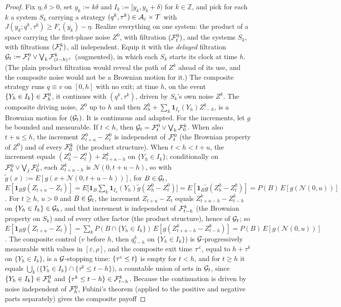 \begin{proof}
Fix $\eta,\delta>0$, set $y_k:=k\delta$ and $I_k:=[y_k,y_k+\delta)$ for $k\in\mathbb Z$, and pick for each $k$ a system $S_k$ carrying a strategy $(q^k,\tau^k)\in\mathcal{A}_\varepsilon\times\mathcal{T}$ with $J(y_k;q^k,\tau^k)\ge F_\varepsilon(y_k)-\eta$. Realize everything on one system: the product of a space carrying the first-phase noise $Z^0$, with filtration $(\mathcal{F}^0_t)$, and the systems $S_k$, with filtrations $(\mathcal{F}^k_t)$, all independent. Equip it with the \emph{delayed} filtration $\mathcal{G}_t:=\mathcal{F}^0_t\vee\bigvee_k\mathcal{F}^k_{(t-h)^+}$ (augmented), in which each $S_k$ starts its clock at time $h$. (The plain product filtration would reveal the path of $Z^k$ ahead of its use, and the composite noise would not be a Brownian motion for it.) The composite strategy runs $q\equiv v$ on $[0,h]$ with no exit; at time $h$, on the event $\{Y_h\in I_k\}\in\mathcal{F}^0_h$, it continues with $(q^k,\tau^k)$, driven by $S_k$'s own noise $Z^k$. The composite driving noise, $Z^0$ up to $h$ and then $Z^0_h+\sum_k\mathbf 1_{I_k}(Y_h)Z^k_{\cdot-h}$, is a Brownian motion for $(\mathcal{G}_t)$. It is continuous and adapted. For the increments, let $g$ be bounded and measurable. If $t<h$, then $\mathcal{G}_t=\mathcal{F}^0_t\vee\bigvee_k\mathcal{F}^k_0$. When also $t+u\le h$, the increment $Z^0_{t+u}-Z^0_t$ is independent of $\mathcal{F}^0_t$ (the Brownian property of $Z^0$) and of every $\mathcal{F}^k_0$ (the product structure). When $t<h<t+u$, the increment equals $(Z^0_h-Z^0_t)+Z^k_{t+u-h}$ on $\{Y_h\in I_k\}$; conditionally on $\mathcal{F}^0_h\vee\bigvee_j\mathcal{F}^j_0$, each $Z^k_{t+u-h}$ is $\mathcal N(0,t+u-h)$, so with $\tilde g(x):=E[g(x+\mathcal N(0,t+u-h))]$, for $B\in\mathcal{G}_t$, $E[\mathbf 1_Bg(Z_{t+u}-Z_t)]=E\big[\mathbf 1_B\sum_k\mathbf 1_{I_k}(Y_h)\tilde g(Z^0_h-Z^0_t)\big]=E[\mathbf 1_B\tilde g(Z^0_h-Z^0_t)]=P(B)\,E[g(\mathcal N(0,u))]$. For $t\ge h$, $u>0$ and $B\in\mathcal{G}_t$, the increment $Z_{t+u}-Z_t$ equals $Z^k_{t+u-h}-Z^k_{t-h}$ on $\{Y_h\in I_k\}\in\mathcal{G}_h$, and that increment is independent of $\mathcal{F}^k_{t-h}$ (the Brownian property on $S_k$) and of every other factor (the product structure), hence of $\mathcal{G}_t$; so $E[\mathbf 1_Bg(Z_{t+u}-Z_t)]=\sum_kP(B\cap\{Y_h\in I_k\})\,E[g(Z^k_{t+u-h}-Z^k_{t-h})]=P(B)\,E[g(\mathcal N(0,u))]$. The composite control ($v$ before $h$, then $q^k_{t-h}$ on $\{Y_h\in I_k\}$) is $\mathcal{G}$-progressively measurable with values in $[\varepsilon,\rho]$, and the composite exit time $\tau^{\rm c}$, equal to $h+\tau^k$ on $\{Y_h\in I_k\}$, is a $\mathcal{G}$-stopping time: $\{\tau^{\rm c}\le t\}$ is empty for $t<h$, and for $t\ge h$ it equals $\bigcup_k\big(\{Y_h\in I_k\}\cap\{\tau^k\le t-h\}\big)$, a countable union of sets in $\mathcal{G}_t$, since $\{Y_h\in I_k\}\in\mathcal{F}^0_h$ and $\{\tau^k\le t-h\}\in\mathcal{F}^k_{t-h}$. Because the continuation is driven by noise independent of $\mathcal{F}^0_h$, Fubini's theorem (applied to the positive and negative parts separately) gives the composite payoff

\end{proof}

